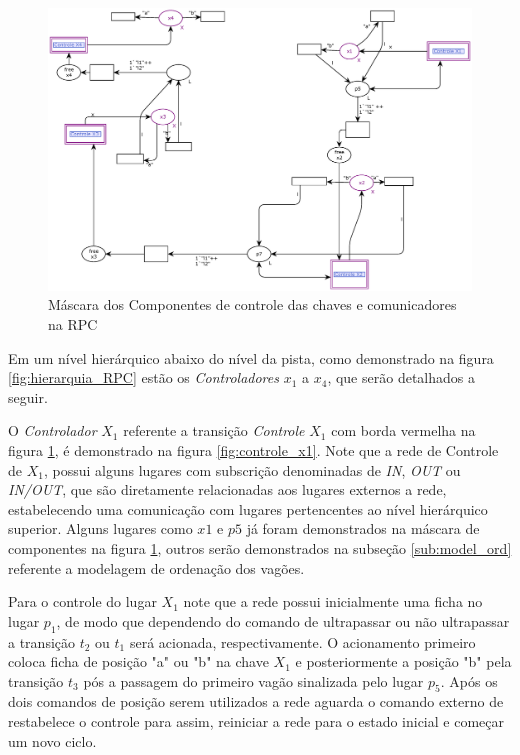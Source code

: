 \begin{figure}[ht]
    \centering
    \caption{Máscara dos Componentes de controle das chaves e comunicadores na RPC}
    \label{fig:free_control}
    \includegraphics[width=1\linewidth]{figures//Simulation//Modelagem/free_control.eps}
\end{figure}


Em um nível hierárquico abaixo do nível da pista, como demonstrado na figura \ref{fig:hierarquia_RPC} estão os \textit{Controladores} $x_1$ a $x_4$, que serão detalhados a seguir. 

O \textit{Controlador} $X_1$ referente a transição \textit{Controle} $X_1$ com borda vermelha na figura \ref{fig:free_control}, é demonstrado na figura \ref{fig:controle_x1}. Note que a rede de Controle de $X_1$, possui alguns lugares com subscrição denominadas de \textit{IN}, \textit{OUT} ou \textit{IN/OUT}, que são diretamente relacionadas aos lugares externos a rede, estabelecendo uma comunicação com lugares pertencentes ao nível hierárquico superior. Alguns lugares como $x1$ e $p5$ já foram demonstrados na máscara de componentes na figura \ref{fig:free_control}, outros serão demonstrados na subseção \ref{sub:model_ord} referente a modelagem de ordenação dos vagões.

Para o controle do lugar $X_1$ note que a rede possui inicialmente uma ficha no lugar $p_1$, de modo que dependendo do comando de ultrapassar ou não ultrapassar a transição $t_2$ ou $t_1$ será acionada, respectivamente. O acionamento primeiro coloca ficha de posição "a" ou "b" na chave $X_1$ e posteriormente a posição "b" pela transição $t_3$ pós a passagem do primeiro vagão sinalizada pelo lugar $p_5$. Após os dois comandos de posição serem utilizados a rede aguarda o comando externo de restabelece o controle para assim, reiniciar a rede para o estado inicial e começar um novo ciclo.

